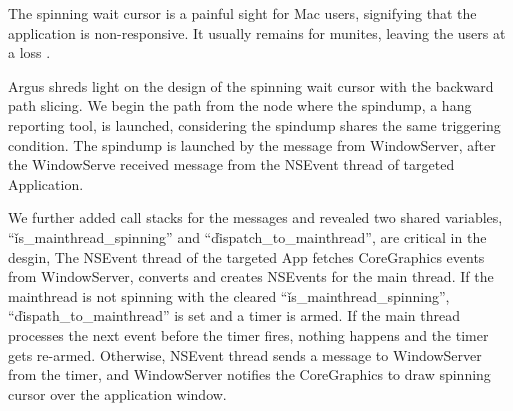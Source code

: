 The spinning wait cursor is a painful sight for Mac users, signifying that the application is non-responsive.
It usually remains for munites, leaving the users at a loss .                    

Argus shreds light on the design of the spinning wait cursor with the backward path slicing.
We begin the path from the node where the spindump, a hang reporting tool, is launched,  
considering the spindump shares the same triggering condition.
The spindump is launched by the message from WindowServer, after the WindowServe received message from the NSEvent thread of targeted Application.

We further added call stacks for the messages and revealed two shared variables, ``\v{is\_mainthread\_spinning}'' and ``\v{dispatch\_to\_mainthread}'', are critical in the desgin,
The NSEvent thread of the targeted App fetches CoreGraphics events from WindowServer, converts and creates NSEvents for the main thread.
If the mainthread is not spinning with the cleared ``\v{is\_mainthread\_spinning}'', ``\v{dispath\_to\_mainthread}'' is set and a timer is armed.
If the main thread processes the next event before the timer fires, nothing happens and the timer gets re-armed.
Otherwise, NSEvent thread sends a message to WindowServer from the timer,
and WindowServer notifies the CoreGraphics to draw spinning cursor over the application window.
